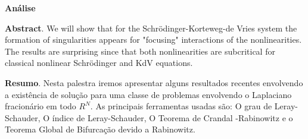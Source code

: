 
\pagestyle{fancy}

\lhead{}
\rhead{}


\renewcommand{\headrulewidth}{0.4pt}
\renewcommand{\footrulewidth}{0.4pt}


\begin{center}
	\huge{{\bf An\'{a}lise}}
	\vspace{1cm}
\end{center}





	\noindent\textbf{Abstract}.\label{adan} We will show that for the Schrödinger-Korteweg-de Vries system the formation of singularities appears for "focusing" interactions of the nonlinearities. The results are surprising since that both nonlinearities are subcritical for classical nonlinear Schrödinger and KdV equations.

\vspace{24pt}

	
	
	\noindent\textbf{Resumo}.\label{ca} 
	Nesta palestra iremos apresentar alguns resultados recentes envolvendo a existência de solução para uma classe de problemas envolvendo o Laplaciano fracionário em todo $R^N$. As principais ferramentas usadas são: O grau de Leray-Schauder, O índice de Leray-Schauder, O Teorema de Crandal -Rabinowitz e o Teorema Global de Bifurcação devido a Rabinowitz.

